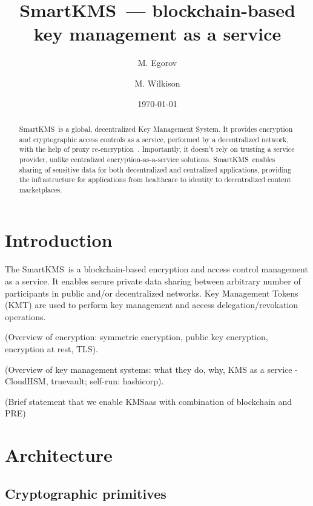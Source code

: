 \documentclass[notitlepage,longbibliography]{revtex4-1}
\newcommand{\kms}{SmartKMS}
\begin{document}
\title{\kms~--- blockchain-based key management as a service}

\author{M. Egorov}
\author{M. Wilkison}


\begin{abstract}
    \kms~is a global, decentralized Key Management System.
    It provides encryption and cryptographic access controls as a service, performed by a decentralized network,
    with the help of proxy re-encryption~\cite{wiki:pre}.
    Importantly, it doesn't rely on trusting a service provider, unlike centralized encryption-as-a-service solutions.
    \kms~enables sharing of sensitive data for both decentralized and centralized applications,
    providing the infrastructure for applications from healthcare to identity to decentralized content marketplaces.
\end{abstract}

\date{\today}
\maketitle

\section{Introduction}

The \kms~is a blockchain-based encryption and access control management as a service.
It enables secure private data sharing between arbitrary number of participants in public and/or decentralized networks.
Key Management Tokens (KMT) are used to perform key management and access delegation/revokation operations.

(Overview of encryption: symmetric encryption, public key encryption, encryption at rest, TLS).

(Overview of key management systems: what they do, why, KMS as a service - CloudHSM, truevault; self-run: hashicorp).

(Brief statement that we enable KMSaas with combination of blockchain and PRE)

\section{Architecture}

\subsection{Cryptographic primitives}
\end{document}
